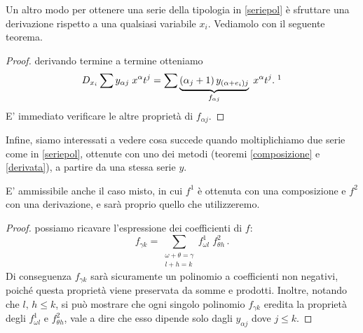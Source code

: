 Un altro modo per ottenere una serie della tipologia in \eqref{seriepol} è sfruttare una derivazione rispetto a una qualsiasi variabile $x_i$. Vediamolo con il seguente teorema.
\begin{theorem}[derivazione]\label{derivata}
\end{theorem}
\begin{proof} derivando termine a termine otteniamo
$$ D_{x_i} \sum y_{\alpha j} \; x^\alpha t^j = \sum  \underbrace{(\alpha_j+1) \, y_{(\alpha+e_i)j}}_{f_{\alpha j}} \; x^\alpha t^j. \; \footnotemark$$ 
E' immediato verificare le altre proprietà di $f_{\alpha j}$.
\end{proof}

Infine, siamo interessati a vedere cosa succede quando moltiplichiamo due serie come in \eqref{seriepol}, ottenute con uno dei metodi (teoremi \ref{composizione} e \ref{derivata}), a partire da una stessa serie $y$.
\begin{theorem}\label{prodotto}
\end{theorem}

\begin{remark}
E' ammissibile anche il caso misto, in cui $f^1$ è ottenuta con una composizione e $f^2$ con una derivazione, e sarà proprio quello che utilizzeremo.
\end{remark}

\begin{proof} possiamo ricavare l'espressione dei coefficienti di $f$:
$$f_{\gamma k} = \sum_{\substack{\omega+\theta=\gamma \\ l+h=k}} f^1_{\omega l}\;  f^2_{\theta h}\, .$$
Di conseguenza $f_{\gamma k}$ sarà sicuramente un polinomio a coefficienti non negativi, poiché questa proprietà viene preservata da somme e prodotti. Inoltre, notando che $l,\, h \leq k$, si può mostrare che ogni singolo polinomio $f_{\gamma k}$ eredita la proprietà degli $f^1_{\omega l}$ e $f^2_{\theta h}$, vale a dire che esso dipende solo dagli $y_{\alpha j}$ dove $j \leq k$.
\end{proof}

